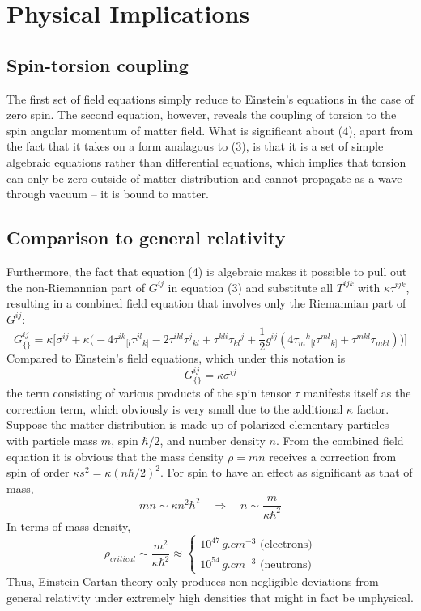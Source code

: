 \documentclass[12pt]{article}
\begin{document}
\section{Physical Implications}
\subsection{Spin-torsion coupling}
The first set of field equations simply reduce to Einstein's equations in the case of zero spin. The second equation, however, reveals the coupling of torsion to the spin angular momentum of matter field. What is significant about (4), apart from the fact that it takes on a form analagous to (3), is that it is a set of simple algebraic equations rather than differential equations, which implies that torsion can only be zero outside of matter distribution and cannot propagate as a wave through vacuum -- it is bound to matter.
\subsection{Comparison to general relativity}
Furthermore, the fact that equation (4) is algebraic makes it possible to pull out the non-Riemannian part of $G^{ij}$ in equation (3) and substitute all $T^{ijk}$ with $\kappa\tau^{ijk}$, resulting in a combined field equation that involves only the Riemannian part of $G^{ij}$\cite{hehl1976general}:
\[ G^{ij}_{\{\}}  = \kappa \Bigg[\sigma^{ij} + \kappa\Big( -4\tau^{ik}{}_{[l}\tau^{jl}{}_{k]} 
-2\tau^{ikl}\tau^j{}_{kl} + \tau^{kli}\tau_{kl}{}^j + \frac{1}{2}g^{ij}\left( 4\tau_m{}^k{}_{[l}\tau^{ml}{}_{k]} + \tau^{mkl}\tau_{mkl} \right)\Big) \Bigg] \]
Compared to Einstein's field equations, which under this notation is
\[G^{ij}_{\{\}} = \kappa \sigma^{ij} \]
the term consisting of various products of the spin tensor $\tau$ manifests itself as the correction term, which obviously is very small due to the additional $\kappa$ factor. Suppose the matter distribution is made up of polarized elementary particles with particle mass $m$, spin $\hbar/2$, and number density $n$. From the combined field equation it is obvious that the mass density $\rho = mn$ receives a correction from spin of order $\kappa s^2 = \kappa (n\hbar/2)^2$. For spin to have an effect as significant as that of mass,
\[ mn \sim \kappa n^2\hbar^2 \quad\Rightarrow\quad n \sim \frac{m}{\kappa \hbar^2} \]
In terms of mass density\cite{hehl1976general},
\[ \rho_{critical} \sim \frac{m^2}{\kappa \hbar^2} \approx \begin{cases}
10^{47} \, \si{g.cm^{-3}} \text{ (electrons)} \\
10^{54} \,\si{g.cm^{-3}} \text{ (neutrons)}
\end{cases}\]
Thus, Einstein-Cartan theory only produces non-negligible deviations from general relativity under extremely high densities that might in fact be unphysical. 

{}

\end{document}
